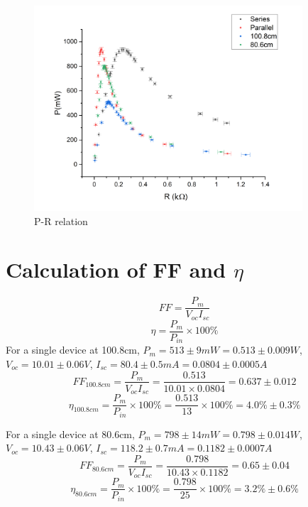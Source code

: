 \documentclass[12pt,a4paper]{article}
\begin{document}
\begin{figure}[H]
    \centering
    \includegraphics[width=10cm]{rp.png}
    \caption{P-R relation}
\end{figure}

\section{Calculation of FF and $\eta$}
\begin{equation*}
    FF=\frac{P_m}{V_{oc}I_{sc}}
\end{equation*}
\begin{equation*}
    \eta=\frac{P_m}{P_{in}}\times100\%
\end{equation*}
For a single device at 100.8cm, $P_m=513\pm9mW=0.513\pm0.009W$, $V_{oc}=10.01\pm0.06V$, $I_{sc}=80.4\pm0.5mA=0.0804\pm0.0005A$
\begin{equation*}
    FF_{100.8cm}=\frac{P_m}{V_{oc}I_{sc}}=\frac{0.513}{10.01\times0.0804}=0.637\pm0.012
\end{equation*}
\begin{equation*}
    \eta_{100.8cm}=\frac{P_m}{P_{in}}\times100\%=\frac{0.513}{13}\times100\%=4.0\%\pm0.3\%
\end{equation*}

For a single device at 80.6cm, $P_m=798\pm14mW=0.798\pm0.014W$, $V_{oc}=10.43\pm0.06V$, $I_{sc}=118.2\pm0.7mA=0.1182\pm0.0007A$
\begin{equation*}
    FF_{80.6cm}=\frac{P_m}{V_{oc}I_{sc}}=\frac{0.798}{10.43\times0.1182}=0.65\pm0.04
\end{equation*}
\begin{equation*}
    \eta_{80.6cm}=\frac{P_m}{P_{in}}\times100\%=\frac{0.798}{25}\times100\%=3.2\%\pm0.6\%
\end{equation*}
\end{document}

